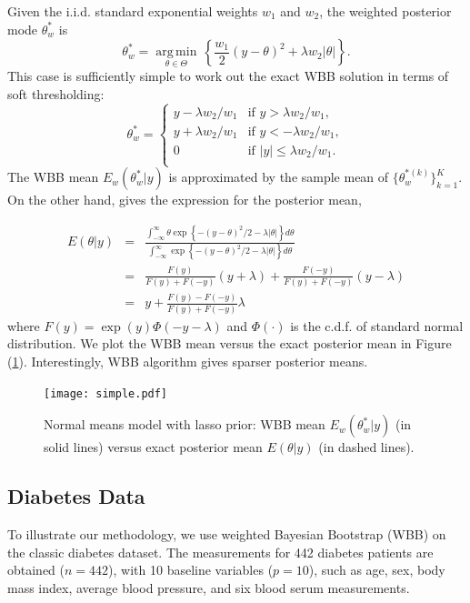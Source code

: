 \documentclass[11pt]{article}%
\DeclareMathOperator*{\argmin}{arg\,min} %
\begin{document}
\noindent Given the i.i.d. standard exponential weights $w_1$ and $w_2$, the weighted posterior mode $\theta^*_w$ is 
$$
\theta^*_w = \underset{\theta \in \Theta}{\argmin}\, \left\{\frac{w_1}{2} (y-\theta)^2 + \lambda w_2 |\theta|\right\}.
$$
This case is sufficiently simple to work out the exact WBB solution in terms of soft thresholding:
$$
\theta^*_w = 
\begin{cases}
y - \lambda w_2/w_1 &\mbox{if $y > \lambda w_2/w_1$},\\
y + \lambda w_2/w_1 &\mbox{if $y < -\lambda w_2/w_1$},\\
0 &\mbox{if $|y| \leq \lambda w_2/w_1$}.\\
\end{cases}
$$
The WBB mean $E_{w}(\theta^*_w|y)$ is approximated by the sample mean of $\{ \theta^{*(k)}_w\}_{k=1}^K$. On the other hand, \cite{mitchell1994note} gives the expression for the posterior mean, 

\begin{eqnarray*}
E(\theta|y) &=& \frac{\int_{-\infty}^\infty \theta\exp\left\{-(y-\theta)^2/2 - \lambda |\theta|\right\} d\theta}{\int_{-\infty}^\infty \exp\left\{-(y-\theta)^2/2 - \lambda |\theta|\right\} d\theta}\\
&=& \frac{F(y)}{F(y) + F(-y)}(y+\lambda) + \frac{F(-y)}{F(y) + F(-y)}(y-\lambda)\\
&=& y + \frac{F(y) - F(-y)}{F(y) + F(-y)}\lambda
\end{eqnarray*}
where $F(y) = \exp(y)\Phi(-y-\lambda)$ and $\Phi(\cdot)$ is the c.d.f. of standard normal distribution. We plot  the WBB mean versus the exact posterior mean in Figure (\ref{simple}).  Interestingly, WBB algorithm gives sparser posterior means. 

\begin{figure}[ht]
\centering 
\texttt{[image: simple.pdf]} 
\caption{Normal means model with lasso prior: WBB mean $E_{w}(\theta^*_w|y)$ (in solid lines) versus exact posterior mean $E(\theta|y)$ (in dashed lines).}
\label{simple}
\end{figure}


\subsection{Diabetes Data}
To illustrate our methodology, we use weighted Bayesian Bootstrap (WBB) on the classic diabetes dataset. The measurements for 442 diabetes patients are obtained ($n=442$), with 10 baseline variables ($p=10$), such as age, sex, body mass index, average blood pressure, and six blood serum measurements. \\
\end{document}
